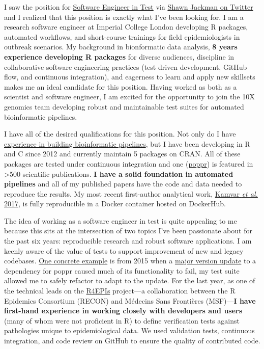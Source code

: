 I saw the position for
\href{https://boards.greenhouse.io/10xgenomics/jobs/1769868?gh_jid=1769868#application}{Software
Engineer in Test} via
\href{https://twitter.com/sjackman/status/1189977010908454912?s=20}{Shawn
Jackman on Twitter} and I realized that this position is exactly what I've been
looking for. I am a research software engineer at Imperial College London
developing R packages, automated workflows, and short-course trainings for field
epidemiologists in outbreak scenarios. My background in bionformatic data
analysis, \textbf{8 years experience developing R packages} for diverse
audiences, discipline in collaborative software engineering practices (test 
driven development, GitHub flow, and continuous integration), and eagerness to
learn and apply new skillsets makes me an ideal candidate for this position.
Having worked as both as a scientist and software engineer, I am excited for
the opportunity to join the 10X genomics team developing robust and
maintainable test suites for automated bioinformatic pipelines.

\vspace{1ex}

I have all of the desired qualifications for this position. Not only do I have
\href{https://github.com/zkamvar/read-processing}{experience in building
bioinformatic pipelines}, but I have been developing in R and C since 2012
and currently maintain 5 packages on CRAN. All of these packages are tested
under continuous integration and one
(\href{https://grunwaldlab.github.io/poppr}{poppr}) is featured in
\textgreater500 scientific publications. \textbf{I have a solid foundation in automated
pipelines} and all of my published papers have the code and data needed to
reproduce the results.  My most recent first-author analytical work,
\href{https://peerj.com/articles/4152/}{Kamvar \textit{et al.} 2017}, is fully
reproducible in a Docker container hosted on DockerHub.

\vspace{1ex}

The idea of working as a software engineer in test is quite appealing to me
because this sits at the intersection of two topics I've been passionate about
for the past six years: reproducible research and robust software applications.
I am keenly aware of the value of tests to support improvement of new and
legacy codebases. \href{https://github.com/grunwaldlab/poppr/issues/16}{One
concrete example} is from 2015 when a
\href{https://github.com/thibautjombart/adegenet/commit/add256cd11f37e4865e4278e6bf3ffa81bcd0f63}{major
version update} to a dependency for poppr caused much of its functionality to
fail, my test suite allowed me to safely refactor to adapt to the update. For
the last year, as one of the technical leads on the
\href{https://r4epis.netlify.com}{R4EPIs} project---a collaboration between the
R Epidemics Consortium (RECON) and M\'{e}decins Sans Fronti\`{e}res (MSF)---\textbf{I
have first-hand experience in working closely with developers and users} (many
of whom were not proficient in R) to define verification tests against
pathologies unique to epidemiological data. We used validation tests,
continuous integration, and code review on GitHub to ensure the quality of
contributed code.

